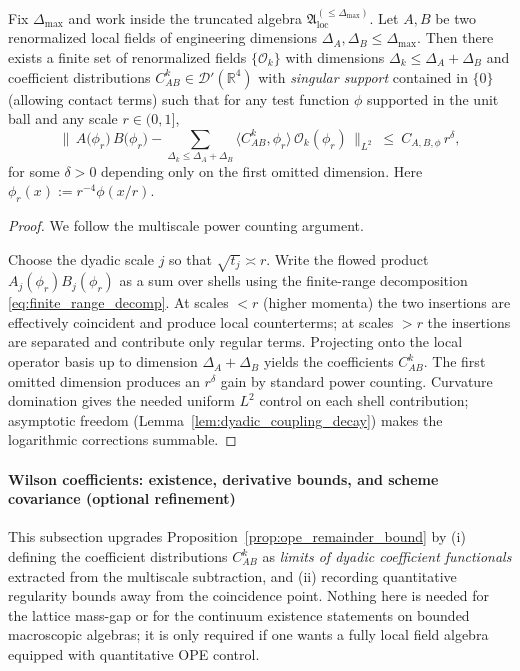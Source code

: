 \begin{proposition}
\label{prop:ope_remainder_bound}
Fix $\Delta_{\max}$ and work inside the truncated algebra $\mathfrak A_{\mathrm{loc}}^{(\le\Delta_{\max})}$.
Let $A,B$ be two renormalized local fields of engineering dimensions $\Delta_A,\Delta_B\le\Delta_{\max}$.
Then there exists a finite set of renormalized fields $\{\mathcal O_k\}$ with dimensions $\Delta_k\le \Delta_A+\Delta_B$ and
coefficient distributions $C_{AB}^k\in \mathcal D'(\mathbb R^4)$ with \emph{singular support} contained in $\{0\}$ (allowing contact terms) such that for any test function $\phi$ supported in the unit ball and
any scale $r\in(0,1]$,
\[
\biggl\|\,A\bigl(\phi_r\bigr)\,B\bigl(\phi_r\bigr)
-\sum_{\Delta_k\le \Delta_A+\Delta_B} \bigl\langle C_{AB}^k,\phi_r\bigr\rangle\,\mathcal O_k(\phi_r)\,\biggr\|_{L^2}
\ \le\ C_{A,B,\phi}\, r^{\delta},
\]
for some $\delta>0$ depending only on the first omitted dimension.
Here $\phi_r(x):=r^{-4}\phi(x/r)$.
\end{proposition}

\begin{proof}
We follow the multiscale power counting argument.

Choose the dyadic scale $j$ so that $\sqrt{t_j}\asymp r$.
Write the flowed product $A_j(\phi_r)B_j(\phi_r)$ as a sum over shells using the finite-range decomposition
\eqref{eq:finite_range_decomp}.
At scales $<r$ (higher momenta) the two insertions are effectively coincident and produce local counterterms; at scales $>r$ the
insertions are separated and contribute only regular terms.
Projecting onto the local operator basis up to dimension $\Delta_A+\Delta_B$ yields the coefficients $C_{AB}^k$.
The first omitted dimension produces an $r^{\delta}$ gain by standard power counting.
Curvature domination gives the needed uniform $L^2$ control on each shell contribution; asymptotic freedom (Lemma~\ref{lem:dyadic_coupling_decay})
makes the logarithmic corrections summable.
\end{proof}



\paragraph*{Wilson coefficients: existence, derivative bounds, and scheme covariance (optional refinement)}
\label{subsubsec:wilson_coefficients}

This subsection upgrades Proposition~\ref{prop:ope_remainder_bound} by (i) defining the coefficient distributions
$C_{AB}^k$ as \emph{limits of dyadic coefficient functionals} extracted from the multiscale subtraction,
and (ii) recording quantitative regularity bounds away from the coincidence point.
Nothing here is needed for the lattice mass-gap or for the continuum existence statements on bounded macroscopic algebras; it is
only required if one wants a fully local field algebra equipped with quantitative OPE control.

